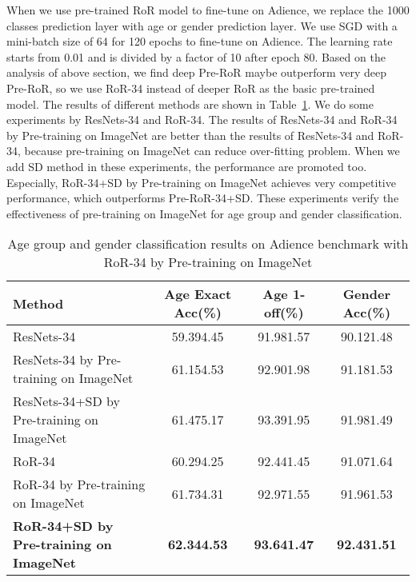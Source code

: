 \documentclass[journal]{IEEEtran}
\begin{document}
When we use pre-trained RoR model to fine-tune on Adience, we replace the 1000 classes prediction layer with age or gender prediction layer. We use SGD with a mini-batch size of 64 for 120 epochs to fine-tune on Adience. The learning rate starts from 0.01 and is divided by a factor of 10 after epoch 80. Based on the analysis of above section, we find deep Pre-RoR maybe outperform very deep Pre-RoR, so we use RoR-34 instead of deeper RoR as the basic pre-trained model. The results of different methods are shown in Table~\ref{tab:agegenderimagenet}. We do some experiments by ResNets-34 and RoR-34. The results of ResNets-34 and RoR-34 by Pre-training on ImageNet are better than the results of ResNets-34 and RoR-34, because pre-training on ImageNet can reduce over-fitting problem. When we add SD method in these experiments, the performance are promoted too. Especially, RoR-34+SD by Pre-training on ImageNet achieves very competitive performance, which outperforms Pre-RoR-34+SD. These experiments verify the effectiveness of pre-training on ImageNet for age group and gender classification. 
\begin{table}[!t]
\renewcommand{\arraystretch}{1.3}
\caption{Age group and gender classification results on Adience benchmark with RoR-34 by Pre-training on ImageNet}
\label{tab:agegenderimagenet}
\centering
\begin{tabular}{|p{1.8cm}|c|c|c|}
\hline
Method                                       &Age Exact Acc(\%)            &Age 1-off(\%)                 &Gender Acc(\%) \\ \hline\hline
ResNets-34                                   &59.394.45               &91.981.57                &90.121.48                            \\\hline
ResNets-34 by Pre-training on ImageNet        &61.154.53               &92.901.98                &91.181.53                            \\\hline
ResNets-34+SD by Pre-training on ImageNet     &61.475.17               &93.391.95                &91.981.49                            \\\hline
RoR-34                                   &60.294.25               &92.441.45                &91.071.64                            \\\hline
RoR-34 by Pre-training on ImageNet        &61.734.31               &92.971.55                &91.961.53                            \\\hline
\textbf{RoR-34+SD by Pre-training on ImageNet}     &\textbf{62.344.53}               &\textbf{93.641.47}                &\textbf{92.431.51}                            \\\hline

\end{tabular}
\end{table}
\end{document}
